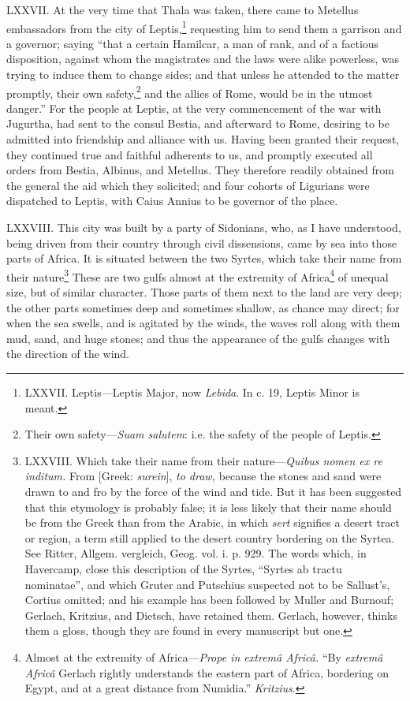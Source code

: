 LXXVII. At the very time that Thala was taken, there came to Metellus
embassadors from the city of Leptis,\footnote{LXXVII. Leptis—Leptis Major, now \emph{Lebida}. In c. 19, Leptis Minor
is meant.} requesting him to send them
a garrison and a governor; saying ``that a certain Hamilcar, a man of
rank, and of a factious disposition, against whom the magistrates and
the laws were alike powerless, was trying to induce them to change
sides; and that unless he attended to the matter promptly, their own
safety,\footnote{Their own safety—\emph{Suam salutem}: i.e. the safety of the people of
Leptis.} and the allies of Rome, would be in the utmost danger.''
For the people at Leptis, at the very commencement of the war with
Jugurtha, had sent to the consul Bestia, and afterward to Rome,
desiring to be admitted into friendship and alliance with us. Having
been granted their request, they continued true and faithful adherents
to us, and promptly executed all orders from Bestia, Albinus, and
Metellus. They therefore readily obtained from the general the aid
which they solicited; and four cohorts of Ligurians were dispatched to
Leptis, with Caius Annius to be governor of the place.

LXXVIII. This city was built by a party of Sidonians, who, as I have
understood, being driven from their country through civil dissensions,
came by sea into those parts of Africa. It is situated between the two
Syrtes, which take their name from their nature\footnote{LXXVIII. Which take their name from their nature—\emph{Quibus
nomen ex re inditum.} From [Greek: \emph{surein}], \emph{to draw,} because the
stones and sand were drawn to and fro by the force of the wind and
tide. But it has been suggested that this etymology is probably false;
it is less likely that their name should be from the Greek than from
the Arabic, in which \emph{sert} signifies a desert tract or region, a term
still applied to the desert country bordering on the Syrtea. See
Ritter, Allgem. vergleich, Geog. vol. i. p. 929. The words which, in
Havercamp, close this description of the Syrtes, ``Syrtes ab tractu
nominatae'', and which Gruter and Putschius suspected not to be
Sallust's, Cortius omitted; and his example has been followed by
Muller and Burnouf; Gerlach, Kritzius, and Dietsch, have retained
them. Gerlach, however, thinks them a gloss, though they are found in
every manuscript but one.} These are two
gulfs almost at the extremity of Africa\footnote{Almost at the extremity of Africa—\emph{Prope in extremâ Africâ.}
``By \emph{extremâ Africâ} Gerlach rightly understands the eastern part of
Africa, bordering on Egypt, and at a great distance from Numidia.''
\emph{Kritzius}.} of unequal size, but of
similar character. Those parts of them next to the land are very deep;
the other parts sometimes deep and sometimes shallow, as chance may
direct; for when the sea swells, and is agitated by the winds, the
waves roll along with them mud, sand, and huge stones; and thus the
appearance of the gulfs changes with the direction of the wind.

